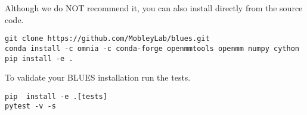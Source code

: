 Although we do NOT recommend it, you can also install directly from the
source code.

\begin{verbatim}
git clone https://github.com/MobleyLab/blues.git
conda install -c omnia -c conda-forge openmmtools openmm numpy cython
pip install -e .
\end{verbatim}

To validate your BLUES installation run the tests.

\begin{verbatim}
pip  install -e .[tests]
pytest -v -s 
\end{verbatim}
